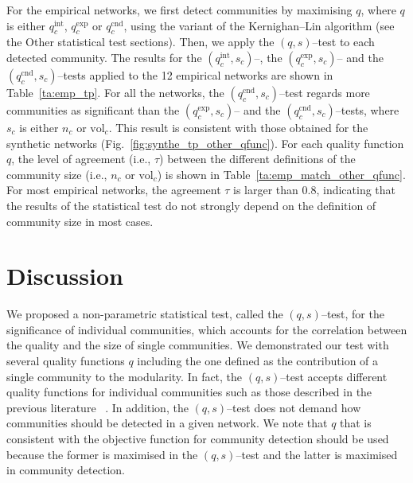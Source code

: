 \documentclass[fleqn,10pt]{wlscirep}
\def\qint{q^{\text{int}}}
\def\qexp{q^{\text{exp}}}
\def\qcnd{q^{\text{cnd}}}
\def\vol{\text{vol}}
\begin{document}
 

For the empirical networks, we first detect communities by maximising $q$, where $q$ is either $\qint_c$, $\qexp_c$ or $\qcnd_c$, using the variant of the Kernighan--Lin algorithm (see the Other statistical test sections).
Then, we apply the $(q,s)$--test to each detected community.
The results for the $(\qint_c, s_c)$--, the $(\qexp_c, s_c)$-- and the $(\qcnd_c, s_c)$--tests applied to the 12 empirical networks are shown in Table~\ref{ta:emp_tp}.
For all the networks, the $(\qcnd_c, s_c)$--test regards more communities as significant than the $(\qexp_c, s_c)$-- and the $(\qcnd_c, s_c)$--tests, where $s_c$ is either $n_c$ or $\vol_c$. 
This result is consistent with those obtained for the synthetic networks (Fig.~\ref{fig:synthe_tp_other_qfunc}).
For each quality function $q$, the level of agreement (i.e., $\tau$) between the different definitions of the community size (i.e., $n_c$ or $\vol_c$) is shown in Table~\ref{ta:emp_match_other_qfunc}.
For most empirical networks, the agreement $\tau$ is larger than $0.8$, indicating that the results of the statistical test do not strongly depend on the definition of community size in most cases. 


\section{Discussion}
\label{sec:discussion}
We proposed a non-parametric statistical test, called the $(q,s)$--test, for the significance of individual communities, which accounts for the correlation between the quality and the size of single communities.
We demonstrated our test with several quality functions $q$ including the one defined as the contribution of a single community to the modularity.
In fact, the $(q,s)$--test accepts different quality functions for individual communities such as those described in the previous literature ~\cite{Leskovec2010,Chen2014,Lambiotte2014,Zhang2014,Yang2015}. 
In addition, the $(q,s)$--test does not demand how communities should be detected in a given network. 
We note that $q$ that is consistent with the objective function for community detection should be used because the former is maximised in the $(q, s)$--test and the latter is maximised in community detection.
\end{document}
